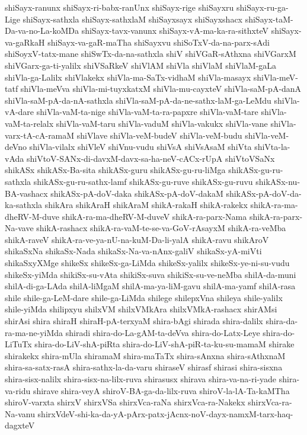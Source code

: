 {shiSayx-ranunx
shiSayx-ri-babx-ranUnx
shiSayx-rige
shiSayxru
shiSayx-ru-ga-Lige
shiSayx-sathxla
shiSayx-sathxlaM
shiSayxsayx
shiSayxshacx
shiSayx-taM-Da-va-no-La-koMDa
shiSayx-tavx-vanunx
shiSayx-vA-ma-ka-ra-sithxteV
shiSayx-va-gaRkaH
shiSayx-va-gaR-maTha
shiSayxvu
shiSoTxV-da-na-parx-sAdi
shiSoyxV-tatx-mane
shiSwTx-da-na-sathxla
shiV
shiVGaR-sAthxna
shiVGarxM
shiVGarx-ga-ti-yalilx
shiVSaRkeV
shiVlAM
shiVla
shiVlaM
shiVlaM-gaLa
shiVla-ga-Lalilx
shiVlakekx
shiVla-ma-SaTx-vidhaM
shiVla-masayx
shiVla-meV-tatf
shiVla-meVva
shiVla-mi-tuyxkatxM
shiVla-mu-cayxteV
shiVla-saM-pA-danA
shiVla-saM-pA-da-nA-sathxla
shiVla-saM-pA-da-ne-sathx-laM-ga-LeMdu
shiVla-vA-dare
shiVla-vaM-ta-nige
shiVla-vaM-ta-ra-papxre
shiVla-vaM-tare
shiVla-vaM-ta-relalx
shiVla-vaM-taru
shiVla-vaduM
shiVla-vakukx
shiVla-vane
shiVla-varx-tA-cA-ramaM
shiVlave
shiVla-veM-budeV
shiVla-veM-budu
shiVla-veM-deVno
shiVla-vilalx
shiVleV
shiVnu-vudu
shiVsA
shiVsAsaM
shiVta
shiVta-la-vAda
shiVtoV-SANx-di-davxM-davx-sa-ha-neV-cACx-rUpA
shiVtoVSaNx
shikASx
shikASx-Ba-sita
shikASx-guru
shikASx-gu-ru-liMga
shikASx-gu-ru-sathxla
shikASx-gu-ru-sathx-lamf
shikASx-gu-ruve
shikASx-gu-ruvu
shikASx-nu-BA-vashacx
shikASx-pA-doV-daka
shikASx-pA-doV-dakaM
shikASx-pA-doV-da-ka-sathxla
shikAra
shikAraH
shikAraM
shikA-rakaH
shikA-rakekx
shikA-ra-ma-dheRV-M-duve
shikA-ra-ma-dheRV-M-duveV
shikA-ra-parx-Nama
shikA-ra-parx-Na-vave
shikA-rashacx
shikA-ra-vaM-te-se-va-GoV-rAsayxM
shikA-ra-veMba
shikA-raveV
shikA-ra-ve-ya-nU-na-kuM-Da-li-yalA
shikA-ravu
shikAroV
shikaSxNa
shikaSx-Nada
shikaSx-Na-va-nAnx-galiV
shikaSx-yA-miVti
shikaSxyXMge
shikeSx
shikeSx-ga-LiMda
shikeSx-yalilx
shikeSx-ye-ni-su-vudu
shikeSx-yiMda
shikiSx-su-vAta
shikiSx-suva
shikiSx-su-ve-neMba
shilA-da-muni
shilA-di-ga-LAda
shilA-liMgaM
shilA-ma-ya-liM-gavu
shilA-ma-yamf
shilA-rasa
shile
shile-ga-LeM-dare
shile-ga-LiMda
shilege
shilepxVna
shileya
shile-yalilx
shile-yiMda
shilipxyu
shilxVM
shilxVMkAra
shilxVMkA-rashacx
shirAMsi
shirAsi
shira
shiraH
shiraH-pA-terxyaM
shira-bAgi
shirada
shira-dalilx
shira-da-ra-ma-ne-yiMda
shiradi
shira-do-La-gAM-ta-deVva
shira-do-Latx-Leye
shira-do-LiTuTx
shira-do-LiV-shA-piRta
shira-do-LiV-shA-piR-ta-ku-su-mamaM
shirake
shirakekx
shira-mUla
shiramaM
shira-maTaTx
shira-sAnxna
shira-sAthxnaM
shira-sa-satx-rasA
shira-sathx-la-da-varu
shiraseV
shirasf
shirasi
shira-sisxna
shira-sisx-nalilx
shira-sisx-na-lilx-ruva
shirasusx
shirava
shira-va-na-ri-yade
shira-va-ridu
shirave
shira-veyA
shiroV-BA-ga-da-lilx-ruva
shiroV-la-lA-Ta-kaMTha
shiroV-varxta
shirxV
shirxVSa
shirxVca-raNa
shirxVca-ra-Nakekx
shirxVca-ra-Na-vanu
shirxVdeV-shi-ka-da-yA-pArx-patx-jAcnx-noV-dayx-namxM-tarx-haq-dagxteV
}
